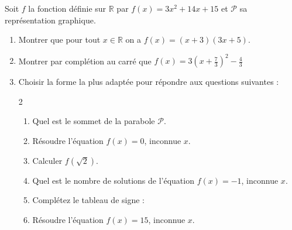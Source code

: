 \documentclass[main.tex]{subfiles}
\begin{document}
\begin{exercise} 
	 Soit $f$ la fonction définie sur $\mathbb{R}$ par $f(x) =3x^2+14x+15$ et $\mathscr{P}$ sa représentation graphique.
	\begin{enumerate}[leftmargin=*,label=\arabic*)]
		\item Montrer que pour tout $x\in\mathbb{R}$ on a $f(x)=(x+3)(3x+5)$.
		\item Montrer par complétion au carré que $f(x)=3\left(x+\frac{7}{3} \right)^2 -\frac{4}{3} $
		\item Choisir la forme la plus adaptée pour répondre aux questions suivantes :
		\vspace{-1em}
\begin{multicols}{2}
	\begin{enumerate}[leftmargin=*,label=\alph*)]
			\item Quel est le sommet de la parabole  $\mathscr{P}$.
			\item Résoudre l'équation $f(x)=0$, inconnue $x$.
			\item Calculer $f(\sqrt{2})$.
			\item Quel est le nombre de solutions de l'équation $f(x)=-1$, inconnue $x$.
			\item Complétez le tableau de signe :\\
			\item Résoudre l'équation $f(x)=15$, inconnue $x$.
		\end{enumerate} 
	\end{multicols}
	\end{enumerate} 
\end{exercise} 
\end{document}
